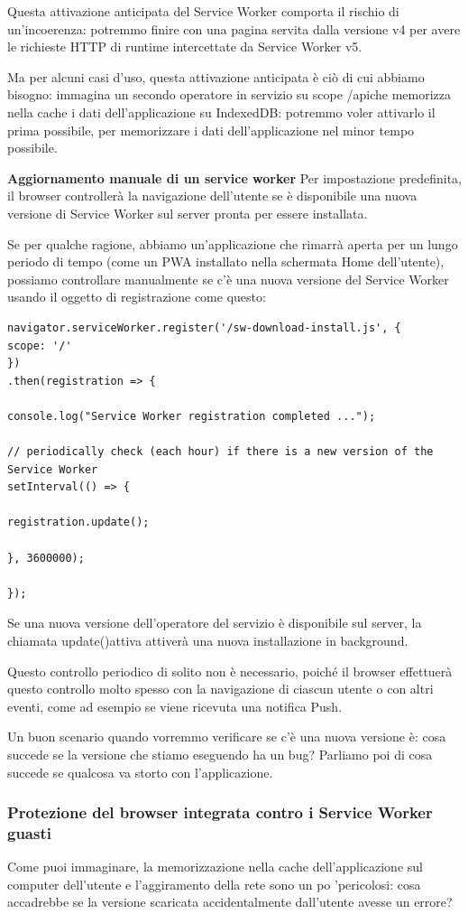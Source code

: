 \documentclass[italian]{article}
\begin{document}
Questa attivazione anticipata del Service Worker comporta il rischio di un'incoerenza: potremmo finire con una pagina servita dalla versione v4 per avere le richieste HTTP di runtime intercettate da Service Worker v5.

Ma per alcuni casi d'uso, questa attivazione anticipata è ciò di cui abbiamo bisogno: immagina un secondo operatore in servizio su scope /apiche memorizza nella cache i dati dell'applicazione su IndexedDB: potremmo voler attivarlo il prima possibile, per memorizzare i dati dell'applicazione nel minor tempo possibile.

\textbf{Aggiornamento manuale di un service worker}
Per impostazione predefinita, il browser controllerà la navigazione dell'utente se è disponibile una nuova versione di Service Worker sul server pronta per essere installata.

Se per qualche ragione, abbiamo un'applicazione che rimarrà aperta per un lungo periodo di tempo (come un PWA installato nella schermata Home dell'utente), possiamo controllare manualmente se c'è una nuova versione del Service Worker usando il oggetto di registrazione come questo:
\begin{lstlisting}
navigator.serviceWorker.register('/sw-download-install.js', {
scope: '/'
})
.then(registration => {

console.log("Service Worker registration completed ...");

// periodically check (each hour) if there is a new version of the Service Worker
setInterval(() => {

registration.update();

}, 3600000);

});
\end{lstlisting}
Se una nuova versione dell'operatore del servizio è disponibile sul server, la chiamata update()attiva attiverà una nuova installazione in background.

Questo controllo periodico di solito non è necessario, poiché il browser effettuerà questo controllo molto spesso con la navigazione di ciascun utente o con altri eventi, come ad esempio se viene ricevuta una notifica Push.

Un buon scenario quando vorremmo verificare se c'è una nuova versione è: cosa succede se la versione che stiamo eseguendo ha un bug? Parliamo poi di cosa succede se qualcosa va storto con l'applicazione.
\subsubsection{Protezione del browser integrata contro i Service Worker guasti}
Come puoi immaginare, la memorizzazione nella cache dell'applicazione sul computer dell'utente e l'aggiramento della rete sono un po 'pericolosi: cosa accadrebbe se la versione scaricata accidentalmente dall'utente avesse un errore?
\end{document}
